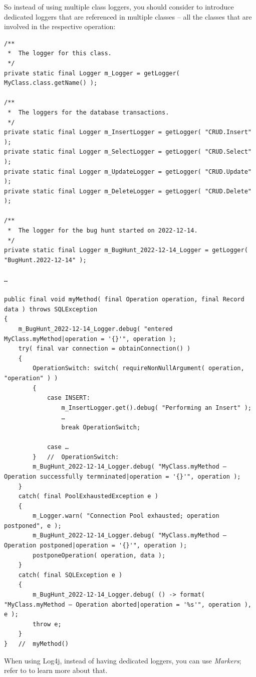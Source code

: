 So instead of using multiple class loggers, you should consider to introduce dedicated loggers that are referenced in multiple classes – all the classes that are involved in the respective operation:
\begin{lstlisting}
/**
 *  The logger for this class.
 */
private static final Logger m_Logger = getLogger( MyClass.class.getName() ); 

/**
 *  The loggers for the database transactions.
 */
private static final Logger m_InsertLogger = getLogger( "CRUD.Insert" );
private static final Logger m_SelectLogger = getLogger( "CRUD.Select" );
private static final Logger m_UpdateLogger = getLogger( "CRUD.Update" );
private static final Logger m_DeleteLogger = getLogger( "CRUD.Delete" );

/**
 *  The logger for the bug hunt started on 2022-12-14.
 */
private static final Logger m_BugHunt_2022-12-14_Logger = getLogger( "BugHunt.2022-12-14" ); 

…

public final void myMethod( final Operation operation, final Record data ) throws SQLException
{
    m_BugHunt_2022-12-14_Logger.debug( "entered MyClass.myMethod|operation = '{}'", operation );
    try( final var connection = obtainConnection() )
    {
        OperationSwitch: switch( requireNonNullArgument( operation, "operation" ) )
        {
            case INSERT:
                m_InsertLogger.get().debug( "Performing an Insert" );
                …
                break OperationSwitch;
                
            case …
        }   //  OperationSwitch:
        m_BugHunt_2022-12-14_Logger.debug( "MyClass.myMethod – Operation successfully termninated|operation = '{}'", operation );       
    }
    catch( final PoolExhaustedException e )
    {
        m_Logger.warn( "Connection Pool exhausted; operation postponed", e );
        m_BugHunt_2022-12-14_Logger.debug( "MyClass.myMethod – Operation postponed|operation = '{}'", operation );       
        postponeOperation( operation, data ); 
    }    
    catch( final SQLException e )
    {
        m_BugHunt_2022-12-14_Logger.debug( () -> format( "MyClass.myMethod – Operation aborted|operation = '%s'", operation ), e );
        throw e;
    }
}   //  myMethod() 
\end{lstlisting}

When using Log4j, instead of having dedicated loggers, you can use \textit{Markers}; refer to \autocite{APACHE_LOG4J:Markers} to learn more about that.

